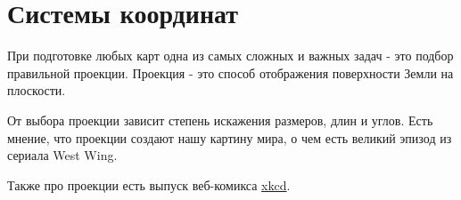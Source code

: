\documentclass[
]{book}
\begin{document}
\hypertarget{ux441ux438ux441ux442ux435ux43cux44b-ux43aux43eux43eux440ux434ux438ux43dux430ux442}{%
\section{Системы координат}\label{ux441ux438ux441ux442ux435ux43cux44b-ux43aux43eux43eux440ux434ux438ux43dux430ux442}}

При подготовке любых карт одна из самых сложных и важных задач - это подбор правильной проекции. Проекция - это способ отображения поверхности Земли на плоскости.

От выбора проекции зависит степень искажения размеров, длин и углов. Есть мнение, что проекции создают нашу картину мира, о чем есть великий эпизод из сериала West Wing.

Также про проекции есть выпуск веб-комикса \href{https://xkcd.com/977/}{xkcd}.
\end{document}
